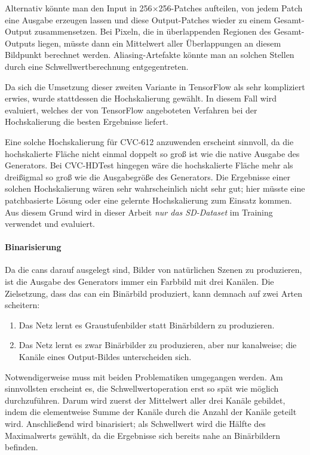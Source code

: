 Alternativ könnte man den Input in 256$\times$256-Patches aufteilen, von jedem Patch eine Ausgabe erzeugen lassen und diese Output-Patches wieder zu einem Gesamt-Output zusammensetzen.
Bei Pixeln, die in überlappenden Regionen des Gesamt-Outputs liegen, müsste dann ein Mittelwert aller Überlappungen an diesem Bildpunkt berechnet werden.
Aliasing-Artefakte könnte man an solchen Stellen durch eine Schwellwertberechnung entgegentreten.

Da sich die Umsetzung dieser zweiten Variante in TensorFlow als sehr kompliziert erwies, wurde stattdessen die Hochskalierung gewählt.
In diesem Fall wird evaluiert, welches der von TensorFlow angeboteten Verfahren bei der Hochskalierung die besten Ergebnisse liefert.

Eine solche Hochskalierung für CVC-612 anzuwenden erscheint sinnvoll, da die hochskalierte Fläche nicht einmal doppelt so groß ist wie die native Ausgabe des Generators.
Bei CVC-HDTest hingegen wäre die hochskalierte Fläche mehr als dreißigmal so groß wie die Ausgabegröße des Generators.
Die Ergebnisse einer solchen Hochskalierung wären sehr wahrscheinlich nicht sehr gut; hier müsste eine patchbasierte Lösung oder eine gelernte Hochskalierung zum Einsatz kommen.
Aus diesem Grund wird in dieser Arbeit \emph{nur das SD-Dataset} im Training verwendet und evaluiert.



\paragraph{Binarisierung}

Da die \glspl{can} darauf ausgelegt sind, Bilder von natürlichen Szenen zu produzieren, ist die Ausgabe des Generators immer ein Farbbild mit drei Kanälen.
Die Zielsetzung, dass das \gls{can} ein Binärbild produziert, kann demnach auf zwei Arten scheitern:

\begin{enumerate}
	\item Das Netz lernt es Graustufenbilder statt Binärbildern zu produzieren.
	\item Das Netz lernt es zwar Binärbilder zu produzieren, aber nur kanalweise; die Kanäle eines Output-Bildes unterscheiden sich.
\end{enumerate}

Notwendigerweise muss mit beiden Problematiken umgegangen werden.
Am sinnvollsten erscheint es, die Schwellwertoperation erst so spät wie möglich durchzuführen.
Darum wird zuerst der Mittelwert aller drei Kanäle gebildet, indem die elementweise Summe der Kanäle durch die Anzahl der Kanäle geteilt wird.
Anschließend wird binarisiert; als Schwellwert wird die Hälfte des Maximalwerts gewählt, da die Ergebnisse sich bereits nahe an Binärbildern befinden.

